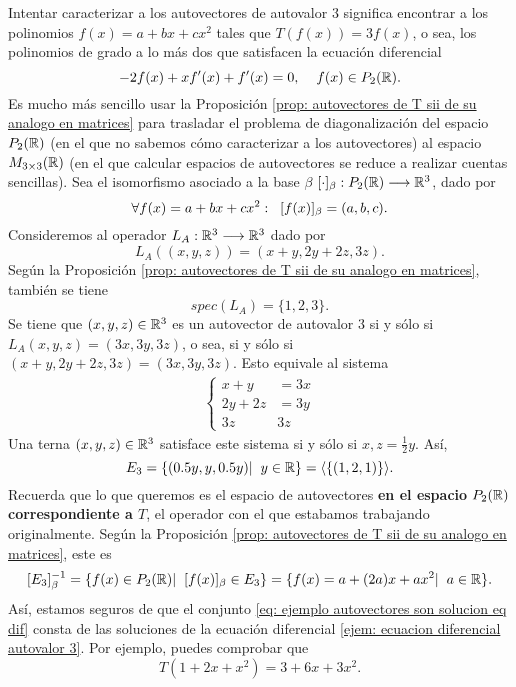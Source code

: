 \begin{ejem}
Intentar caracterizar a los autovectores de autovalor $3$
significa encontrar a los polinomios 
$f(x) = a + bx+ cx^{2}$ tales que 
$T(f(x)) = 3 f(x)$, o sea, los polinomios de grado a lo más
dos que satisfacen la ecuación diferencial
\begin{equation}
	\label{ejem: ecuacion diferencial autovalor 3}
	-2f(x) + x f'(x) + f'(x) = 0, 
	\hspace{0.4cm} f(x) \in P_{2}(\mathbb{R}).	
\end{equation}
Es mucho más sencillo usar la Proposición 
\ref{prop: autovectores de T sii de su analogo en matrices}
para trasladar el problema de diagonalización del espacio
$P_{2}(\mathbb{R})$ (en el que no sabemos cómo caracterizar a los
autovectores) al espacio $M_{3 \times 3}(\mathbb{R})$
(en el que calcular espacios de autovectores se reduce a realizar
cuentas sencillas).
Sea el isomorfismo asociado a la base $\beta$
$[\cdot]_{\beta}: P_{2}(\mathbb{R}) \longrightarrow \mathbb{R}^{3}$,
dado por 
\[
\forall f(x) = a + bx + cx^{2} : \hspace{0.2cm}
[f(x)]_{\beta} = (a, b, c).
\]
Consideremos al operador $L_{A}: \mathbb{R}^{3} \longrightarrow \mathbb{R}^{3}$
dado por 
\[
L_{A}((x, y, z)) = (x + y, 2y+2z, 3z).
\]
Según la Proposición 
\ref{prop: autovectores de T sii de su analogo en matrices},
también se tiene
\[
spec(L_{A}) = \{1, 2, 3 \}.
\]
Se tiene que
$(x, y, z) \in \mathbb{R}^{3}$ es un autovector de autovalor $3$
si y sólo si 
$L_{A}(x, y, z) = (3x, 3y, 3z)$, o sea, si y sólo si 
$(x+y, 2y+2z, 3z) = (3x, 3y, 3z)$. Esto equivale al sistema
\begin{align*}
\begin{cases}
x+y & = 3x \\
2y+2z & = 3y \\
3z & 3z
\end{cases}
\end{align*}
Una terna $(x, y, z) \in \mathbb{R}^{3}$ satisface este sistema si y sólo si 
$x, z = \frac{1}{2} y$.
Así,
\[
E_{3} = \{ (0.5 y, y, 0.5 y)  | \hspace{0.2cm} y \in \mathbb{R} \}
= \langle \{ (1, 2, 1) \} \rangle.
\]
Recuerda que lo que queremos es el espacio de autovectores 
\textbf{en el espacio $P_{2}(\mathbb{R})$ correspondiente a $T$}, el
operador con el que estabamos trabajando originalmente. 
Según la Proposición 
\ref{prop: autovectores de T sii de su analogo en matrices},
este es
\begin{equation}
	\label{eq: ejemplo autovectores son solucion eq dif}
[E_{3}]_{\beta}^{-1} = 
\{ f(x) \in P_{2}(\mathbb{R})  | \hspace{0.2cm} [f(x)]_{\beta} \in E_{3} \}
= \{ f(x) = a + (2a) x + a x^{2}  | \hspace{0.2cm} a \in \mathbb{R} \}.
\end{equation}
Así, estamos seguros de que el conjunto 
\eqref{eq: ejemplo autovectores son solucion eq dif} consta de
las soluciones de la ecuación diferencial 
\eqref{ejem: ecuacion diferencial autovalor 3}. Por ejemplo, puedes 
comprobar que 
\[
T(1 + 2x + x^{2}) = 3 + 6x + 3x^{2}.
\]


\end{ejem}
